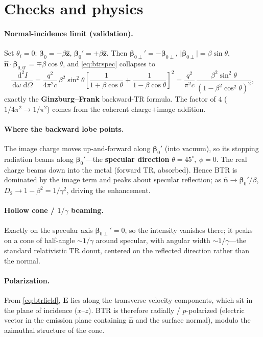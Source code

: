 \documentclass[11pt]{article}
\newcommand{\nhat}{\hat{\bm{n}}}
\newcommand{\zhat}{\hat{\bm{z}}}
\newcommand{\bbeta}{\bm{\beta}}
\newcommand{\bE}{\bm{E}}
\newcommand{\dd}{\,\mathrm{d}}
\begin{document}
\section{Checks and physics}

\paragraph{Normal-incidence limit (validation).}
Set $\theta_i=0$: $\bbeta_0=-\beta\zhat$, $\bbeta_0'=+\beta\zhat$. Then
$\bbeta_{0\perp}'=-\bbeta_{0\perp}$, $\lvert\bbeta_{0\perp}\rvert=\beta\sin\theta$,
$\nhat\cdot\bbeta_{0,0'}=\mp\beta\cos\theta$, and \eqref{eq:btrspec} collapses to
\begin{equation}
\frac{\dd^2 I}{\dd\omega\,\dd\Omega}
=\frac{q^2}{4\pi^2 c}\,\beta^2\sin^2\theta
\left[\frac{1}{1+\beta\cos\theta}+\frac{1}{1-\beta\cos\theta}\right]^2
=\frac{q^2}{\pi^2 c}\,\frac{\beta^2\sin^2\theta}{(1-\beta^2\cos^2\theta)^2},
\end{equation}
exactly the \textbf{Ginzburg--Frank} backward-TR formula. The factor of $4$
($1/4\pi^2\to1/\pi^2$) comes from the coherent charge$+$image addition.
\checkmark

\paragraph{Where the backward lobe points.}
The image charge moves up-and-forward along $\bbeta_0'$ (into vacuum), so its
stopping radiation beams along $\bbeta_0'$---the \textbf{specular direction}
$\theta=45^\circ,\ \phi=0$. The real charge beams down into the metal (forward
TR, absorbed). Hence BTR is dominated by the image term and peaks about
specular reflection; as $\nhat\to\bbeta_0'/\beta$,
$D_2\to1-\beta^2=1/\gamma^2$, driving the enhancement.

\paragraph{Hollow cone / $1/\gamma$ beaming.}
Exactly on the specular axis $\bbeta_{0\perp}'=0$, so the intensity vanishes
there; it peaks on a cone of half-angle $\sim1/\gamma$ around specular, with
angular width $\sim1/\gamma$---the standard relativistic TR donut, centered on
the reflected direction rather than the normal.

\paragraph{Polarization.}
From \eqref{eq:btrfield}, $\bE$ lies along the transverse velocity components,
which sit in the plane of incidence ($x$--$z$). BTR is therefore radially /
$p$-polarized (electric vector in the emission plane containing $\nhat$ and the
surface normal), modulo the azimuthal structure of the cone.
\end{document}
